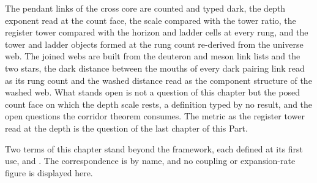 The pendant links of the cross core are counted and typed dark, the depth exponent read at the count face, the scale compared with the tower ratio, the register tower compared with the horizon and ladder cells at every rung, and the tower and ladder objects formed at the rung count re-derived from the universe web. The joined webs are built from the deuteron and meson link lists and the two stars, the dark distance between the mouths of every dark pairing link read as its rung count and the washed distance read as the component structure of the washed web. What stands open is not a question of this chapter but the posed count face on which the depth scale rests, a definition typed by no result, and the open questions the corridor theorem consumes. The metric as the register tower read at the depth is the question of the last chapter of this Part.
\begin{chbridge}
Two terms of this chapter stand beyond the framework, each defined at its first use,  and . The correspondence is by name, and no coupling or expansion-rate figure is displayed here.
\end{chbridge}
